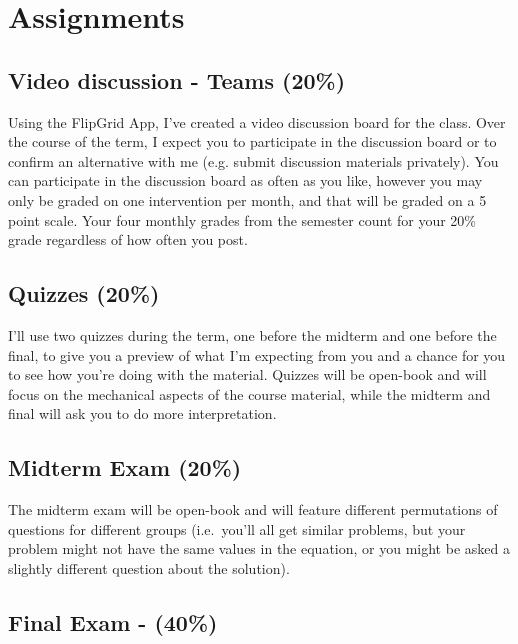 \documentclass[11pt,]{article}
\begin{document}
\hypertarget{assignments}{%
\section{Assignments}\label{assignments}}

\hypertarget{video-discussion---teams-20}{%
\subsection{Video discussion - Teams
(20\%)}\label{video-discussion---teams-20}}

Using the FlipGrid App, I've created a video discussion board for the
class. Over the course of the term, I expect you to participate in the
discussion board or to confirm an alternative with me (e.g. submit
discussion materials privately). You can participate in the discussion
board as often as you like, however you may only be graded on one intervention per month, and that will be graded on a 5 point scale. Your four monthly grades from the semester count for your
20\% grade regardless of how often you post. 

\hypertarget{quizzes-20}{%
\subsection{Quizzes (20\%)}\label{quizzes-20}}

I'll use two quizzes during the term, one before the midterm
and one before the final, to give you a preview of what I'm expecting
from you and a chance for you to see how you're doing with the material.
Quizzes will be open-book and will focus on the mechanical aspects of the course material,
while the midterm and final will ask you to do more interpretation.

\hypertarget{midterm-exam-20}{%
\subsection{Midterm Exam (20\%)}\label{midterm-exam-20}}

The midterm exam will be open-book and will feature
different permutations of questions for different groups (i.e.~you'll
all get similar problems, but your problem might not have the same
values in the equation, or you might be asked a slightly different
question about the solution). 

\hypertarget{final-exam---40}{%
\subsection{Final Exam - (40\%)}\label{final-exam---40}}
\end{document}
